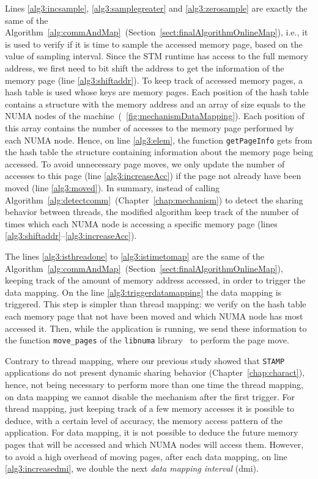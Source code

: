 Lines \ref{alg3:incsample}, \ref{alg3:samplegreater} and \ref{alg3:zerosample} are exactly the same of the Algorithm~\ref{alg:commAndMap}~(Section~\ref{sect:finalAlgorithmOnlineMap}), i.e., it is used to verify if it is time to sample the accessed memory page, based on the value of sampling interval. Since the STM runtime has access to the full memory address, we first need to bit shift the address to get the information of the memory page (line \ref{alg3:shiftaddr}). To keep track of accessed memory pages, a hash table is used whose keys are memory pages. Each position of the hash table contains a structure with the memory address and an array of size equals to the NUMA nodes of the machine~(\figurename~\ref{fig:mechanismDataMapping}). Each position of this array contains the number of accesses to the memory page performed by each NUMA node. Hence,  on line \ref{alg3:elem}, the function \texttt{getPageInfo} gets from the hash table the structure containing information about the memory page being accessed. To avoid unnecessary page moves, we only update the number of accesses to this page (line \ref{alg3:increaseAcc}) if the page not already have been moved (line \ref{alg3:moved}). In summary, instead of calling Algorithm~\ref{alg:detectcomm}~(Chapter~\ref{chap:mechanism}) to detect the sharing behavior between threads, the modified algorithm keep track of the number of times which each NUMA node is accessing a specific memory page (lines \ref{alg3:shiftaddr}--\ref{alg3:increaseAcc}).

The lines \ref{alg3:isthreadone} to \ref{alg3:istimetomap} are the same of the Algorithm~\ref{alg:commAndMap}~(Section~\ref{sect:finalAlgorithmOnlineMap}), keeping track of the amount of memory address accessed, in order to trigger the data mapping. On the line \ref{alg3:triggerdatamapping} the data mapping is triggered. This step is simpler than thread mapping: we verify on the hash table each memory page that not have been moved and which NUMA node has most accessed it. Then, while the application is running, we send these information to the function \texttt{move\_pages} of the \texttt{libnuma} library~\cite{libnuma} to perform the page move.

Contrary to thread mapping, where our previous study showed that \texttt{STAMP} applications do not present dynamic sharing behavior (Chapter~\ref{chap:charact}), hence, not being necessary to perform more than one time the thread mapping, on data mapping we cannot disable the mechanism after the first trigger. For thread mapping, just keeping track of a few memory accesses it is possible to deduce, with a certain level of accuracy, the memory access pattern of the application. For data mapping, it is not possible to deduce the future memory pages that will be accessed and which NUMA nodes will access them. However, to avoid a high overhead of moving pages, after each data mapping, on line \ref{alg3:increasedmi}, we double the next \emph{data mapping interval} (dmi). 

